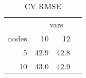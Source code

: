 \begin{table}

\caption{\label{tab:}CV RMSE}
\centering
\begin{tabular}[t]{r|r|r}
\hline
\multicolumn{1}{c|}{ } & \multicolumn{3}{c}{vars} \\
\cline{2-4}
nodes & 10 & 12\\
\hline
5 & 42.9 & 42.8\\
\hline
10 & 43.0 & 42.9\\
\hline
\end{tabular}
\end{table}